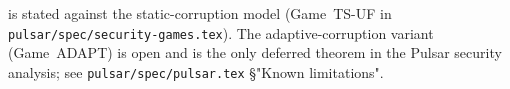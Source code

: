 \begin{remark}
 is stated against the static-corruption
model (Game~TS-UF in \texttt{pulsar/spec/security-games.tex}). The
adaptive-corruption variant (Game~ADAPT) is open and is the only
deferred theorem in the Pulsar security analysis; see
\texttt{pulsar/spec/pulsar.tex} \S "Known limitations".
\end{remark}
